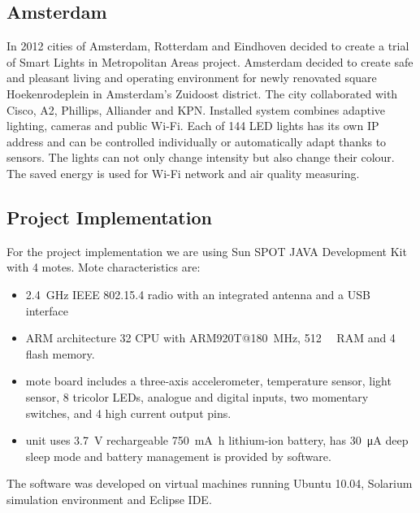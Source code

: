 \documentclass[UKenglish,10pt,a4paper]{report}
\begin{document}
\subsection{Amsterdam}
In 2012 cities of Amsterdam, Rotterdam and Eindhoven decided to create a trial of Smart Lights in Metropolitan Areas project. Amsterdam decided to create safe and pleasant living and operating environment for newly renovated square Hoekenrodeplein in Amsterdam's Zuidoost district. The city collaborated with Cisco, A2, Phillips, Alliander and KPN. Installed system combines adaptive lighting, cameras and public Wi-Fi. Each of 144 LED lights has its own IP address and can be controlled individually or automatically adapt thanks to sensors. The lights can not only change intensity but also change their colour. The saved energy is used for Wi-Fi network and air quality measuring.\cite{amsterdam, amsterdam2}
\subsection{Project Implementation}
For the project implementation we are using Sun SPOT JAVA Development Kit with 4 motes. Mote characteristics are:
\begin{itemize}
\item \SI{2.4}{\giga\hertz} IEEE 802.15.4 radio with an integrated antenna and a USB interface
\item ARM architecture \SI{32}{\bit} CPU with ARM920T@\SI{180}{\mega\hertz}, \SI{512}{\kilo\byte} RAM and \SI{4}{\mega\byte} flash memory.
\item mote board includes a three-axis accelerometer, temperature sensor, light sensor, 8 tricolor LEDs, analogue and digital inputs, two momentary switches, and 4 high current output pins.
\item unit uses \SI{3.7}{\volt} rechargeable \SI{750}{\milli\ampere\hour} lithium-ion battery, has \SI{30}{\micro\ampere} deep sleep mode and battery management is provided by software.
\end{itemize}
The software was developed on virtual machines running Ubuntu 10.04, Solarium simulation environment and Eclipse IDE.
\end{document}
